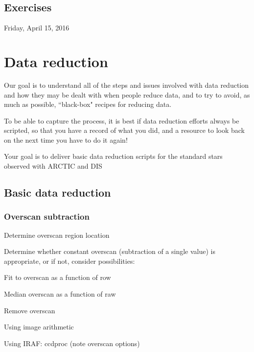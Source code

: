 \documentclass{article}
\begin{document}
\subsection*{Exercises}

\newpage
\textcolor{date}{Friday, April 15, 2016}
\section{Data reduction}

Our goal is to understand all of the steps and issues involved with
data reduction and how they may be dealt with when people reduce data,
and to try to avoid, as much as possible, ``black-box" recipes for
reducing data.

To be able to capture the process, it is best if data reduction
efforts always be scripted, so that you have a record of what you did,
and a resource to look back on the next time you have to do it again!

Your goal is to deliver basic data reduction scripts for the standard
stars observed with ARCTIC and DIS

\subsection*{Basic data reduction}
\subsubsection*{Overscan subtraction}
\begin{itemize*}
    \item Determine overscan region location
    \item Determine whether constant overscan (subtraction of a single value) is
        appropriate, or if not, consider possibilities:
        \begin{itemize*}
            \item Fit to overscan as a function of row
            \item Median overscan as a function of raw
        \end{itemize*}
    \item Remove overscan
        \begin{itemize*}
            \item Using image arithmetic
            \item Using IRAF: ccdproc (note overscan options)
        \end{itemize*}
\end{itemize*}
\end{document}
